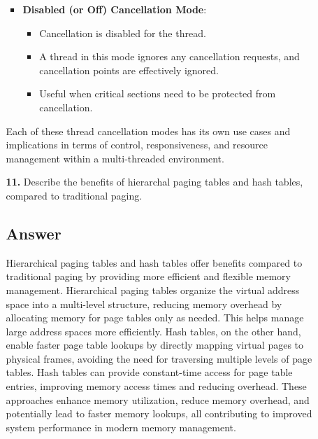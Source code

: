 \documentclass[12pt]{book}
\begin{document}
\begin{itemize}
\begin{itemize}
\begin{itemize}
                \item \textbf{Disabled (or Off) Cancellation Mode}:
                
                \begin{itemize}
                    \item Cancellation is disabled for the thread.
                    \item A thread in this mode ignores any cancellation requests, and cancellation points are effectively ignored.
                    \item Useful when critical sections need to be protected from cancellation.
                \end{itemize}

            \end{itemize}
            Each of these thread cancellation modes has its own use cases and implications in terms of control, responsiveness, and resource management within a multi-threaded environment.
            \newpage
            \item[\textbf{11.}] Describe the benefits of hierarchal paging tables and hash tables, compared to traditional
            paging. 

            \subsection*{Answer}
            Hierarchical paging tables and hash tables offer benefits compared to traditional paging by providing more efficient and flexible memory management. Hierarchical paging tables organize the virtual address space into a multi-level structure, reducing memory overhead by allocating memory for page tables only as needed. This helps manage large address spaces more efficiently. Hash tables, on the other hand, enable faster page table lookups by directly mapping virtual pages to physical frames, avoiding the need for traversing multiple levels of page tables. Hash tables can provide constant-time access for page table entries, improving memory access times and reducing overhead. These approaches enhance memory utilization, reduce memory overhead, and potentially lead to faster memory lookups, all contributing to improved system performance in modern memory management.

        \end{itemize}

    \end{itemize}
\end{document}
